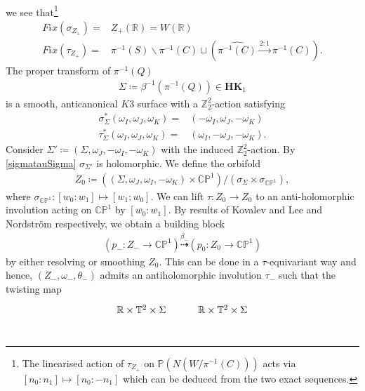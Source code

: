 \documentclass[psamsfonts]{amsart}
\theoremstyle{plain}
\theoremstyle{definition}{
\newtheorem{defi}{Definition}[section]
\newtheorem{ass}{Assumption}
\newtheorem*{nota}{Notation}}
\theoremstyle{remark}{
\newtheorem{rem}{Remark}
\newtheorem{ex}{Example}}
\theoremstyle{plain}{
\newtheorem{thm}{Theorem}[section]
\newtheorem{lem}{Lemma}[section]
\newtheorem{cor}{Corollary}[section]
\newtheorem{prop}{Proposition}[section]
\newtheorem{con}{Conjecture}[section]}
\newcommand{\cat}[1]{\textbf{#1}}
\begin{document}
\begin{ex}
\begin{equation*}
\begin{tikzcd}
    \end{tikzcd}
\end{equation*}
we see that\footnote{The linearised action of $\tau_{Z_+}$ on $\mathbb{P}(N(W/\pi^{-1}(C)))$ acts via $[n_0:n_1]\mapsto [n_0:-n_1]$ which can be deduced from the two exact sequences.}
\begin{align*}
    Fix(\sigma_{Z_+})=&Z_+(\mathbb{R})=W(\mathbb{R})\\
    Fix(\tau_{Z_+})=&\pi^{-1}(S)\backslash\pi^{-1}(C)\sqcup (\widehat{\pi^{-1}(C)}\xrightarrow[]{2:1}\pi^{-1}(C)).
\end{align*}
The proper transform of $\pi^{-1}(Q)$ 
\begin{align*}
    \Sigma \coloneqq \beta^{-1}(\pi^{-1}(Q)) \in \cat{HK}_1
\end{align*}
is a smooth, anticanonical $K3$ surface with a $\mathbb{Z}_2^2$-action satisfying 
\begin{align}
\label{sigmatauSigma}
    \sigma_{\Sigma}^*(\omega_I,\omega_J,\omega_K)=&(-\omega_I,\omega_J,-\omega_K)\\\nonumber
    \tau_{\Sigma}^*(\omega_I,\omega_J,\omega_K)=&(\omega_I,-\omega_J,-\omega_K).
\end{align}
Consider $\Sigma'\coloneqq (\Sigma, \omega_J, -\omega_I, -\omega_K)$ with the induced $\mathbb{Z}_2^2$-action. By \eqref{sigmatauSigma} $\sigma_{\Sigma'}$ is holomorphic. We define the orbifold
\begin{align*}
    Z_0 \coloneqq \left((\Sigma, \omega_J, \omega_I, -\omega_K) \times \mathbb{CP}^1\right)/(\sigma_{\Sigma} \times \sigma_{\mathbb{CP}^1}),
\end{align*}
where $\sigma_{\mathbb{CP}^1}\colon  [w_0:w_1] \mapsto [w_1:w_0]$. We can lift $\tau\colon  Z_0 \rightarrow Z_0$ to an anti-holomorphic involution acting on $\mathbb{CP}^1$ by $[\overline{w_0} \colon\overline{w_1}]$. By results of Kovalev and Lee \cite{kovalev2003twisted} and Nordström \cite{nordstrom2023extra} respectively, we obtain a building block
\begin{align*}
    (p_-\colon Z_- \rightarrow \mathbb{CP}^1) \overset{\beta_-}{\dashrightarrow} (p_0\colon Z_0 \rightarrow \mathbb{CP}^1)
\end{align*}
by either resolving or smoothing $Z_0$. This can be done in a $\tau$-equivariant way and hence, $(Z_-,\omega_-,\theta_-)$ admits an antiholomorphic involution $\tau_-$ such that the twisting map
\begin{equation*}
\begin{tikzcd}
	{\mathbb{R} \times \mathbb{T}^2 \times \Sigma} & {\mathbb{R} \times \mathbb{T}^2 \times \Sigma} \\

\end{tikzcd}
\end{equation*}
\end{ex}
\end{document}
